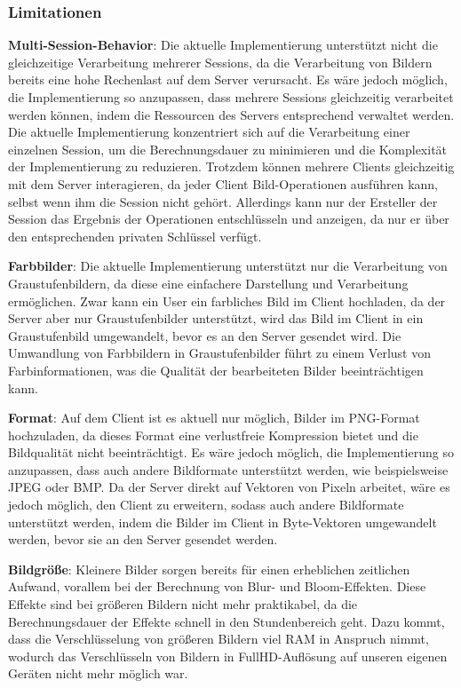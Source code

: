 \subsubsection{Limitationen}
\textbf{Multi-Session-Behavior}:
Die aktuelle Implementierung unterstützt nicht die gleichzeitige Verarbeitung mehrerer Sessions, da die Verarbeitung von Bildern bereits eine hohe Rechenlast auf dem Server verursacht. Es wäre jedoch möglich, die Implementierung so anzupassen, dass mehrere Sessions gleichzeitig verarbeitet werden können, indem die Ressourcen des Servers entsprechend verwaltet werden. Die aktuelle Implementierung konzentriert sich auf die Verarbeitung einer einzelnen Session, um die Berechnungsdauer zu minimieren und die Komplexität der Implementierung zu reduzieren. Trotzdem können mehrere Clients gleichzeitig mit dem Server interagieren, da jeder Client Bild-Operationen ausführen kann, selbst wenn ihm die Session nicht gehört. Allerdings kann nur der Ersteller der Session das Ergebnis der Operationen entschlüsseln und anzeigen, da nur er über den entsprechenden privaten Schlüssel verfügt.

\textbf{Farbbilder}:
Die aktuelle Implementierung unterstützt nur die Verarbeitung von Graustufenbildern, da diese eine einfachere Darstellung und Verarbeitung ermöglichen. Zwar kann ein User ein farbliches Bild im Client hochladen, da der Server aber nur Graustufenbilder unterstützt, wird das Bild im Client in ein Graustufenbild umgewandelt, bevor es an den Server gesendet wird. Die Umwandlung von Farbbildern in Graustufenbilder führt zu einem Verlust von Farbinformationen, was die Qualität der bearbeiteten Bilder beeinträchtigen kann. 

\textbf{Format}:
Auf dem Client ist es aktuell nur möglich, Bilder im PNG-Format hochzuladen, da dieses Format eine verlustfreie Kompression bietet und die Bildqualität nicht beeinträchtigt. Es wäre jedoch möglich, die Implementierung so anzupassen, dass auch andere Bildformate unterstützt werden, wie beispielsweise JPEG oder BMP. Da der Server direkt auf Vektoren von Pixeln arbeitet, wäre es jedoch möglich, den Client zu erweitern, sodass auch andere Bildformate unterstützt werden, indem die Bilder im Client in Byte-Vektoren umgewandelt werden, bevor sie an den Server gesendet werden. 

\textbf{Bildgröße}:
Kleinere Bilder sorgen bereits für einen erheblichen zeitlichen Aufwand, vorallem bei der Berechnung von Blur- und Bloom-Effekten. Diese Effekte sind bei größeren Bildern nicht mehr praktikabel, da die Berechnungsdauer der Effekte schnell in den Stundenbereich geht. Dazu kommt, dass die Verschlüsselung von größeren Bildern viel RAM in Anspruch nimmt, wodurch das Verschlüsseln von Bildern in FullHD-Auflösung auf unseren eigenen Geräten nicht mehr möglich war.